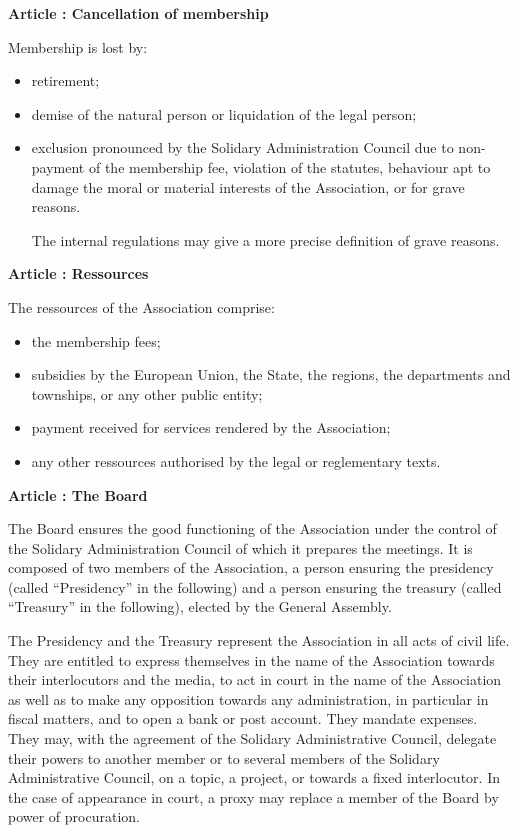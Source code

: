 \documentclass [11pt]{article}
\renewcommand {\section}[1]{\stepcounter {section}%
{\vspace {1em}\noindent\Large \bf Article \thesection: #1 \par}}
\begin{document}
\section {Cancellation of membership}

Membership is lost by:
\begin {itemize}
\item
retirement;
\item
demise of the natural person or liquidation of the legal person;
\item
exclusion pronounced by the Solidary Administration Council
due to non-payment of the membership fee, violation of the statutes,
behaviour apt to damage the moral or material interests of the Association,
or for grave reasons.

The internal regulations may give a more precise
definition of grave reasons.
\end {itemize}


\newpage
\section {Ressources}

The ressources of the Association comprise:
\begin {itemize}
\item
the membership fees;
\item
subsidies by the European Union, the State, the regions, the departments
and townships, or any other public entity;
\item
payment received for services rendered by the Association;
\item
any other ressources authorised by the legal or reglementary texts.
\end {itemize}


\section {The Board}

The Board ensures the good functioning of the Association under the control
of the Solidary Administration Council of which it prepares the meetings.
It is composed of two members of the Association, a person ensuring the
presidency (called ``Presidency'' in the following) and a person ensuring the
treasury (called ``Treasury'' in the following), elected by the General
Assembly.

The Presidency and the Treasury represent the Association in all acts of
civil life. They are entitled to express themselves in the name of the
Association towards their interlocutors and the media, to act in court
in the name of the Association as well as to make any opposition towards
any administration, in particular in fiscal matters, and to open a bank
or post account. They mandate expenses.
They may, with the agreement of the Solidary Administrative Council,
delegate their powers to another member or to several members of the
Solidary Administrative Council, on a topic, a project, or towards a
fixed interlocutor. In the case of appearance in court, a proxy may replace
a member of the Board by power of procuration.
\end{document}
